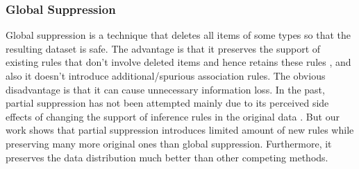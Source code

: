 \begin{table*}[tb]
\caption{The Same Dataset in Table \ref{tab:sample} and Generalization Anonymization Result}
\label{tab:samesample}
\small
\centering
{}
\end{table*}

\subsubsection{Global Suppression}

Global suppression is a technique that deletes all items of some types
so that the resulting dataset is safe. 
The advantage is that it preserves the support of
existing rules that don't involve deleted items and hence retains these rules
\cite{Xu:2008:ATD}, and also it doesn't introduce
additional/spurious association rules.
The obvious disadvantage is that it can cause unnecessary
information loss. In the past, partial suppression
has not been attempted mainly due to its perceived side effects of 
changing the support of inference rules in the original data 
\cite{Xu:2008:ATD,Cao:2010:rho,tkde:VerykiosEBSD04:ARH,tkde:WuCC07:hiding}. 
But our work shows that partial suppression introduces limited
amount of new rules while preserving many more original ones than
global suppression. Furthermore,
it preserves the data distribution much better than
other competing methods.

